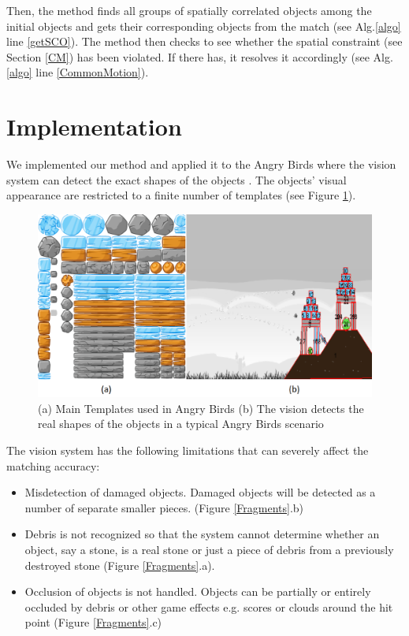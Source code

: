 \documentclass[letterpaper]{article}
\begin{document}
Then, the method finds all groups of spatially correlated objects among the initial objects and gets their corresponding objects from the match (see Alg.\ref{algo} line \ref{getSCO}). The method then checks to see whether the spatial constraint (see Section \ref{CM}) has been violated. If there has, it resolves it accordingly (see Alg.\ref{algo} line \ref{CommonMotion}).

 
\section{Implementation}
We implemented our method and applied it to the Angry Birds where the vision system can detect the exact shapes of the objects \cite{andrewVision}. The objects' visual appearance are restricted to a finite number of templates (see Figure \ref{Templates}).  
\begin{figure}[h!]
\centering\includegraphics[scale=0.28]{Templates.png}\caption{(a) Main Templates used in Angry Birds (b) The vision detects the real shapes of the objects in a typical Angry Birds scenario}
\label{Templates}
\end{figure}
The vision system has the following limitations that can severely affect the matching accuracy: 
\begin{itemize}
\item Misdetection of damaged objects. Damaged objects will be detected as a number of separate smaller pieces. (Figure \ref{Fragments}.b) 
\item Debris is not recognized so that the system cannot determine whether an object, say a stone, is a real stone or just a piece of debris from a previously destroyed stone (Figure \ref{Fragments}.a).
\item Occlusion of objects is not handled. Objects can be partially or entirely occluded by debris or other game effects e.g. scores or clouds around the hit point (Figure \ref{Fragments}.c)
\end{itemize}
\end{document}
